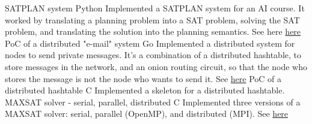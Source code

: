 \documentclass[]{colobas-cv}
\begin{document}
\entry
  {}
  {SATPLAN system}
  {Python}
  {Implemented a SATPLAN system for an AI course. It worked by translating a
  planning problem into a SAT problem, solving the SAT problem, and translating
  the solution into the planning semantics. See here \href{https://github.com/colobas/ia-proj2}{here}}
\entry
  {}
  {PoC of a distributed "e-mail" system}
  {Go}
  {Implemented a distributed system for nodes to send private messages. It's a
  combination of a distributed hashtable, to store messages in the network, and
  an onion routing circuit, so that the node who stores the message is not the
  node who wants to send it. See \href{https://github.com/colobas/distributed-email}{here}}
\entry
  {}
  {PoC of a distributed hashtable}
  {C}
  {Implemented a skeleton for a distributed hashtable.}
\entry
  {}
  {MAXSAT solver - serial, parallel, distributed}
  {C}
  {Implemented three versions of a MAXSAT solver: serial, parallel (OpenMP), and
  distributed (MPI). See \href{https://github.com/colobas/maxsat-solver}{here}}
\end{document}
